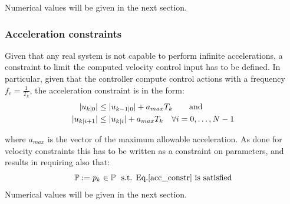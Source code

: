 	Numerical values will be given in the next section.
\subsubsection*{Acceleration constraints}
	Given that any real system is not capable to perform infinite accelerations, a constraint to limit the computed velocity control input has to be defined. In particular, given that the controller compute control actions with a frequency $f_c=\frac{1}{T_k}$, the acceleration constraint is in the form:
	\begin{equation}
		\begin{split}
			\lvert u_{k|0}\rvert &\leq \lvert u_{k-1|0}\rvert + a_{max} T_k\qquad \textnormal{and}\\
			\lvert u_{k|i+1}\rvert &\leq \lvert u_{k|i}\rvert + a_{max} T_k\quad  \forall i=0,\dots,N-1
		\end{split}	
		\label{acc_constr}
	\end{equation}  

	where $a_{max}$ is the vector of the maximum allowable acceleration. As done for velocity constraints this has to be written as a constraint on parameters, and results in requiring also that:
	\begin{equation*}
		\mathbb{P}:=p_k \in \mathbb{P}\ \textnormal{ s.t. Eq.\ref{acc_constr} is satisfied}
	\end{equation*}
	Numerical values will be given in the next section. 


